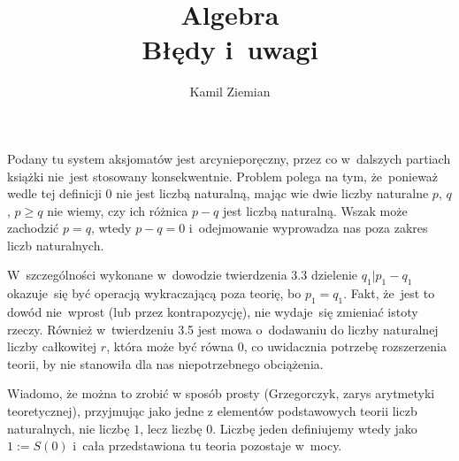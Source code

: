 \documentclass[a4paper,11pt]{article}
\title{Algebra \\
  Błędy i~uwagi}
\author{Kamil Ziemian}
\begin{document}





\maketitle %









\noindent
{} Podany tu system aksjomatów jest arcynieporęczny, przez co
w~dalszych partiach książki nie~jest stosowany konsekwentnie. Problem
polega na tym, że~ponieważ wedle tej definicji 0 nie jest liczbą
naturalną, mając wie dwie liczby naturalne $p$, $q$, $p \geq q$ nie
wiemy, czy ich różnica $p - q$ jest liczbą naturalną. Wszak może
zachodzić $p = q$, wtedy $p - q = 0$ i~odejmowanie wyprowadza nas poza
zakres liczb naturalnych.

W~szczególności wykonane w~dowodzie twierdzenia 3.3 dzielenie
$q_{ 1 } | p_{ 1 } - q_{ 1 }$ okazuje~się być operacją wykraczającą
poza teorię, bo $p_{ 1 } = q_{ 1 }$. Fakt, że~jest to dowód nie~wprost
(lub przez kontrapozycję), nie wydaje~się zmieniać istoty rzeczy.
Również w~twierdzeniu 3.5 jest mowa o~dodawaniu do liczby naturalnej
liczby całkowitej $r$, która może być równa 0, co uwidacznia potrzebę
rozszerzenia teorii, by nie stanowiła dla nas niepotrzebnego
obciążenia.

Wiadomo, że można to zrobić w sposób prosty (Grzegorczyk, zarys
arytmetyki teoretycznej), przyjmując jako jedne z elementów
podstawowych teorii liczb naturalnych, nie liczbę $1$, lecz liczbę
$0$. Liczbę jeden definiujemy wtedy jako $1 := S( 0 )$ i~cała
przedstawiona tu teoria pozostaje w~mocy.





\end{document}
